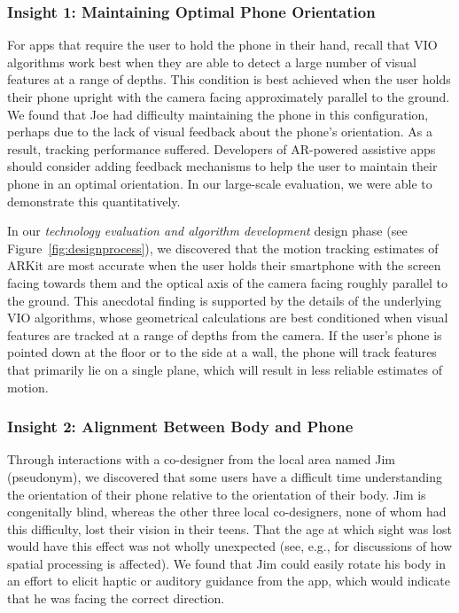 \documentclass[chi_draft]{sigchi}
\begin{document}
\subsubsection{Insight 1: Maintaining Optimal Phone Orientation}
For apps that require the user to hold the phone in their hand, recall that VIO algorithms work best when they are able to detect a large number of visual features at a range of depths.  This condition is best achieved when the user holds their phone upright with the camera facing approximately parallel to the ground.  We found that Joe had difficulty maintaining the phone in this configuration, perhaps due to the lack of visual feedback about the phone's orientation.  As a result, tracking performance suffered.  Developers of AR-powered assistive apps should consider adding feedback mechanisms to help the user to maintain their phone in an optimal orientation.  In our large-scale evaluation, we were able to demonstrate this quantitatively.

In our \emph{technology evaluation and algorithm development} design phase (see Figure~\ref{fig:designprocess}), we discovered that the motion tracking estimates of ARKit are most accurate when the user holds their smartphone with the screen facing towards them and the optical axis of the camera facing roughly parallel to the ground.  This anecdotal finding is supported by the details of the underlying VIO algorithms, whose  geometrical calculations are best conditioned when visual features are tracked at a range of depths from the camera.  If the user's phone is pointed down at the floor or to the side at a wall, the phone will track features that primarily lie on a single plane, which will result in less reliable estimates of motion.


\subsubsection{Insight 2: Alignment Between Body and Phone}
Through interactions with a co-designer from the local area named Jim (pseudonym), we discovered that some users have a difficult time understanding the orientation of their phone relative to the orientation of their body.  Jim is congenitally blind, whereas the other three local co-designers, none of whom had this difficulty, lost their vision in their teens.  That the age at which sight was lost would have this effect was not wholly unexpected (see, e.g., \cite{long1997establishing, wiener2010foundations, schinazi2016spatial, thinus1997representation, williams2014just} for discussions of how spatial processing is affected).  We found that Jim could easily rotate his body in an effort to elicit haptic or auditory guidance from the app, which would indicate that he was facing the correct direction.
\end{document}
